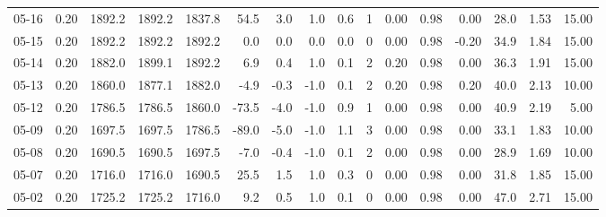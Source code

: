 \begin{threeparttable}
{\begin{tabular}{lrrrrrrrrrrrrrrr}
  05-16 &     0.20 & 1892.2 & 1892.2 & 1837.8 &       54.5 &            3.0 &                      1.0 &                 0.6 &              1 &       0.00 &      0.98 &           0.00 &             28.0 &            1.53 &                  15.00 \\
  05-15 &     0.20 & 1892.2 & 1892.2 & 1892.2 &        0.0 &            0.0 &                      0.0 &                 0.0 &              0 &       0.00 &      0.98 &          -0.20 &             34.9 &            1.84 &                  15.00 \\
  05-14 &     0.20 & 1882.0 & 1899.1 & 1892.2 &        6.9 &            0.4 &                      1.0 &                 0.1 &              2 &       0.20 &      0.98 &           0.00 &             36.3 &            1.91 &                  15.00 \\
  05-13 &     0.20 & 1860.0 & 1877.1 & 1882.0 &       -4.9 &           -0.3 &                     -1.0 &                 0.1 &              2 &       0.20 &      0.98 &           0.20 &             40.0 &            2.13 &                  10.00 \\
  05-12 &     0.20 & 1786.5 & 1786.5 & 1860.0 &      -73.5 &           -4.0 &                     -1.0 &                 0.9 &              1 &       0.00 &      0.98 &           0.00 &             40.9 &            2.19 &                   5.00 \\
  05-09 &     0.20 & 1697.5 & 1697.5 & 1786.5 &      -89.0 &           -5.0 &                     -1.0 &                 1.1 &              3 &       0.00 &      0.98 &           0.00 &             33.1 &            1.83 &                  10.00 \\
  05-08 &     0.20 & 1690.5 & 1690.5 & 1697.5 &       -7.0 &           -0.4 &                     -1.0 &                 0.1 &              2 &       0.00 &      0.98 &           0.00 &             28.9 &            1.69 &                  10.00 \\
  05-07 &     0.20 & 1716.0 & 1716.0 & 1690.5 &       25.5 &            1.5 &                      1.0 &                 0.3 &              0 &       0.00 &      0.98 &           0.00 &             31.8 &            1.85 &                  15.00 \\
  05-02 &     0.20 & 1725.2 & 1725.2 & 1716.0 &        9.2 &            0.5 &                      1.0 &                 0.1 &              0 &       0.00 &      0.98 &           0.00 &             47.0 &            2.71 &                  15.00 \\

\end{tabular}}
\end{threeparttable}
